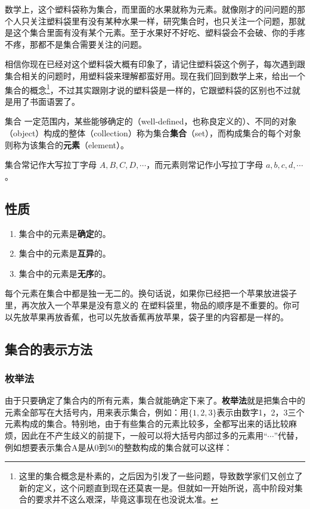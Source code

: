 数学上，这个塑料袋称为集合，而里面的水果就称为元素。就像刚才的问问题的那个人只关注塑料袋里有没有某种水果一样，研究集合时，也只关注一个问题，那就是这个集合里面有没有某个元素。至于水果好不好吃、塑料袋会不会破、你的手疼不疼，那都不是集合需要关注的问题。

相信你现在已经对这个塑料袋大概有印象了，请记住塑料袋这个例子，每次遇到跟集合相关的问题时，用塑料袋来理解都蛮好用。现在我们回到数学上来，给出一个集合的概念\footnote{这里的集合概念是朴素的，之后因为引发了一些问题，导致数学家们又创立了新的定义，这个问题直到现在还莫衷一是。但就如一开始所说，高中阶段对集合的要求并不这么艰深，毕竟这事现在也没说太准。}，不过其实跟刚才说的塑料袋是一样的，它跟塑料袋的区别也不过就是用了书面语罢了。

\begin{definition}{集合}
一定范围内，某些能够确定的（well-defined，也称良定义的）、不同的对象（object）构成的整体（collection）称为集合\textbf{集合}（set），而构成集合的每个对象则称为该集合的\textbf{元素}（element）。

集合常记作大写拉丁字母 $A,B,C,D,\cdots$，而元素则常记作小写拉丁字母 $a,b,c,d,\cdots$ 。
\end{definition}

\subsection{性质}
\begin{enumerate}
\item 集合中的元素是\textbf{确定}的。
\item 集合中的元素是\textbf{互异}的。
\item 集合中的元素是\textbf{无序}的。
\end{enumerate}

每个元素在集合中都是独一无二的。换句话说，如果你已经把一个苹果放进袋子里，再次放入一个苹果是没有意义的
在塑料袋里，物品的顺序是不重要的。你可以先放苹果再放香蕉，也可以先放香蕉再放苹果，袋子里的内容都是一样的。
\subsection{集合的表示方法}

\subsubsection{枚举法}

由于只要确定了集合内的所有元素，集合就能确定下来了。\textbf{枚举法}就是把集合中的元素全部写在大括号内，用来表示集合，例如：用$\{1,2,3\}$表示由数字1，2，3三个元素构成的集合。特别地，由于有些集合的元素比较多，全都写出来的话比较麻烦，因此在不产生歧义的前提下，一般可以将大括号内部过多的元素用“$\cdots$”代替，例如想要表示集合A是从0到50的整数构成的集合就可以这样：

